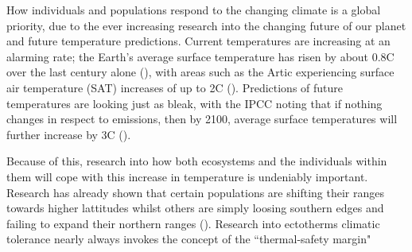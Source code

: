 \documentclass[../Paper.tex]{subfiles}
\begin{document}
How individuals and populations respond to the changing climate is a global priority,
due to the ever increasing research into the changing future of our planet 
and future temperature predictions. Current temperatures are 
increasing at an alarming rate; the Earth's average surface temperature has risen
by about 0.8\degree C over the last century alone (\cite{ipcc_climate_2014}),
with areas such as the Artic experiencing surface air temperature (SAT)
increases of up to 2\degree C (\cite{przybylak_recent_2007}). Predictions 
of future temperatures are looking just as bleak, with the IPCC noting 
that if nothing changes in respect to emissions, then by 2100, average surface
temperatures will further increase by 3\degree C (\cite{ipcc_climate_2014}).

Because of this, research into how both ecosystems and the individuals
within them will cope with this increase in temperature is undeniably 
important. Research has already shown that certain populations are 
shifting their ranges towards higher lattitudes whilst others
 are simply loosing southern edges and failing to expand their northern ranges
(\cite{chen_rapid_2011, sunday_thermal-safety_2014, kerr_climate_2015}).
Research into ectotherms climatic tolerance nearly always invokes the concept
of the ``thermal-safety margin"
\end{document}
